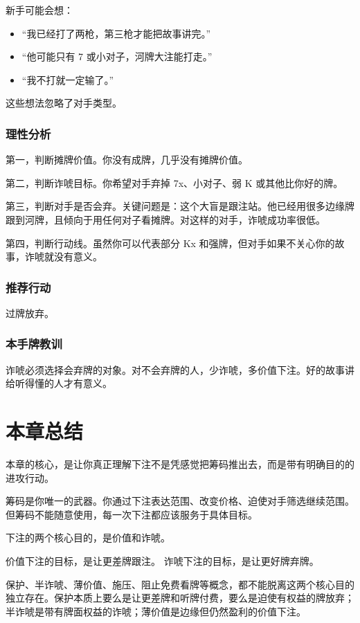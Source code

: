新手可能会想：

\begin{itemize}
\item “我已经打了两枪，第三枪才能把故事讲完。”
\item “他可能只有 7 或小对子，河牌大注能打走。”
\item “我不打就一定输了。”
\end{itemize}

这些想法忽略了对手类型。

\subsubsection*{理性分析}

第一，判断摊牌价值。你没有成牌，几乎没有摊牌价值。

第二，判断诈唬目标。你希望对手弃掉 7x、小对子、弱 K 或其他比你好的牌。

第三，判断对手是否会弃。关键问题是：这个大盲是跟注站。他已经用很多边缘牌跟到河牌，且倾向于用任何对子看摊牌。对这样的对手，诈唬成功率很低。

第四，判断行动线。虽然你可以代表部分 Kx 和强牌，但对手如果不关心你的故事，诈唬就没有意义。

\subsubsection*{推荐行动}

过牌放弃。

\subsubsection*{本手牌教训}

诈唬必须选择会弃牌的对象。对不会弃牌的人，少诈唬，多价值下注。好的故事讲给听得懂的人才有意义。

\section{本章总结}

本章的核心，是让你真正理解下注不是凭感觉把筹码推出去，而是带有明确目的的进攻行动。

筹码是你唯一的武器。你通过下注表达范围、改变价格、迫使对手筛选继续范围。但筹码不能随意使用，每一次下注都应该服务于具体目标。

下注的两个核心目的，是价值和诈唬。

价值下注的目标，是让更差牌跟注。
诈唬下注的目标，是让更好牌弃牌。

保护、半诈唬、薄价值、施压、阻止免费看牌等概念，都不能脱离这两个核心目的独立存在。保护本质上要么是让更差牌和听牌付费，要么是迫使有权益的牌放弃；半诈唬是带有牌面权益的诈唬；薄价值是边缘但仍然盈利的价值下注。

